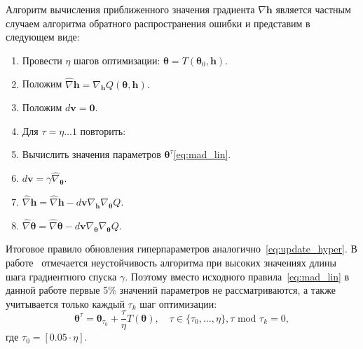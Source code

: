 Алгоритм вычисления приближенного значения градиента $\nabla \mathbf{h}$ является частным случаем алгоритма обратного распространения ошибки и представим в следующем виде:
\begin{enumerate}
\item Провести $\eta$ шагов оптимизации: $\boldsymbol{\theta} = T(\boldsymbol{\theta}_0, \mathbf{h})$.
\item Положим $\hat{\nabla} \mathbf{h} = \nabla_\mathbf{h} Q(\boldsymbol{\theta}, \mathbf{h}).$ 
\item Положим $d\mathbf{v} = \mathbf{0}.$
\item Для $\tau = \eta \dots 1 $ повторить:
\item Вычислить значения параметров $\boldsymbol{\theta}^\tau$\eqref{eq:mad_lin}.
\item $d\mathbf{v} =  \gamma \hat{\nabla}_{\boldsymbol{\theta}}$.
\item $\hat{\nabla} \mathbf{h} =  \hat{\nabla} \mathbf{h} - d\mathbf{v}\nabla_{\mathbf{h}} \nabla_{\boldsymbol{\theta}} Q$.
\item $\hat{\nabla} \boldsymbol{\theta}  = \hat{\nabla} \boldsymbol{\theta}  - d\mathbf{v}\nabla_{\boldsymbol{\theta}} \nabla_{\boldsymbol{\theta}} Q$.
\end{enumerate}

Итоговое правило обновления гиперпараметров аналогично~\eqref{eq:update_hyper}.
В работе~\cite{hyper_mad} отмечается неустойчивость алгоритма при высоких значениях длины шага градиентного спуска $\gamma$. Поэтому вместо исходного правила~\eqref{eq:mad_lin} в данной работе первые 5\% значений параметров не рассматриваются, а также учитывается только каждый $\tau_k$ шаг оптимизации:
\begin{equation}
\label{eq:mad_lin2}
\boldsymbol{\theta}^\tau = \boldsymbol{\theta}_{\tau_0} + \frac{\tau}{\eta} T(\boldsymbol{\theta}), \quad \tau \in \{\tau_0,\dots,\eta\}, \tau \text{ mod } \tau_k = 0,
\end{equation}
где $\tau_0 = [0.05 \cdot \eta]$.
